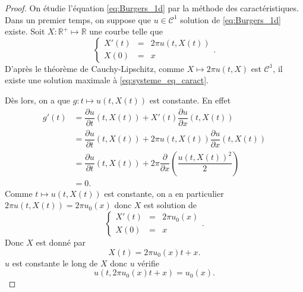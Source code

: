 \begin{proof}
On étudie l'équation \eqref{eq:Burgers_1d} par la méthode des caractéristiques. Dans un premier temps, on suppose que $u \in \mathcal{C}^1$ solution de \eqref{eq:Burgers_1d} existe. Soit $X : \mathbb{R}^+ \mapsto \mathbb{R}$ une courbe telle que
\begin{equation}
\left\lbrace
\begin{array}{rcl}
X'(t) & = & 2 \pi u (t, X(t)) \\
X(0) & = & x
\end{array}
\right. .
\label{eq:systeme_eq_caract}
\end{equation}
D'après le théorème de Cauchy-Lipschitz, comme $X \mapsto 2 \pi u (t, X)$ est $\mathcal{C}^1$, il existe une solution maximale à \eqref{eq:systeme_eq_caract}.

Dès lors, on a que $g : t \mapsto u(t,X(t))$ est constante. En effet
\begin{align*}
g'(t) & = \dfrac{\partial u}{\partial t}(t,X(t)) + X'(t) \dfrac{\partial u}{\partial x} (t,X(t)) \\
	& = \dfrac{\partial u}{\partial t}(t,X(t)) + 2 \pi u (t, X(t)) \dfrac{\partial u}{\partial x} (t,X(t)) \\
	& = \dfrac{\partial u}{\partial t}(t,X(t)) + 2 \pi  \dfrac{\partial }{\partial x} \left( \dfrac{u(t,X(t))^2}{2} \right) \\
	& = 0.
\end{align*}
Comme $t \mapsto u(t,X(t))$ est constante, on a en particulier $2 \pi u (t, X(t)) = 2 \pi u_0(x)$ donc $X$ est solution de 
\begin{equation}
\left\lbrace
\begin{array}{rcl}
X'(t) & = & 2 \pi u_0(x) \\
X(0) & = & x
\end{array}
\right. .
\label{eq:systeme_eq_caract2}
\end{equation}
Donc $X$ est donné par
\begin{equation}
X(t) = 2 \pi u_0(x) t + x.
\end{equation}
$u$ est constante le long de $X$ donc $u$ vérifie
\begin{equation}
u(t,2 \pi u_0(x)t + x)=u_0(x).
\end{equation}


\end{proof}

